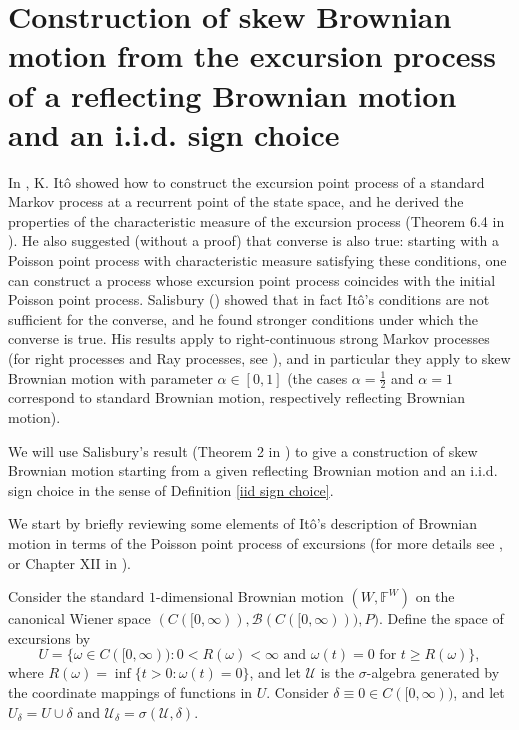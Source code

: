 \documentclass[reqno]{amsart}
\theoremstyle{definition}
\theoremstyle{remark}
\numberwithin{equation}{section}
\begin{document}
\appendix
\section{Construction of skew Brownian motion from the excursion process of a reflecting Brownian motion and an i.i.d. sign choice}\label{Appendix}

In \cite{Ito}, K. It\^{o} showed how to construct the excursion point process of a standard Markov process at a recurrent point of the state space, and he derived the properties of the characteristic measure of the excursion process (Theorem 6.4 in \cite{Ito}). He also suggested (without a proof) that converse is also true: starting with a Poisson point process with characteristic measure satisfying these conditions, one can construct a process whose excursion point process coincides with the initial Poisson point process. Salisbury (\cite{Salisbury1}) showed that in fact It\^{o}'s conditions are not sufficient for the converse, and he found stronger conditions under which the converse is true. His results apply to right-continuous strong Markov processes (for right processes and Ray processes, see \cite{Salisbury2}), and in particular they apply to skew Brownian motion with parameter $\alpha\in [0,1]$ (the cases $\alpha=\frac12$ and $\alpha=1$ correspond to standard Brownian motion, respectively reflecting Brownian motion).

We will use Salisbury's result (Theorem 2 in \cite{Salisbury1}) to give a construction of skew Brownian motion starting from a given reflecting Brownian motion and an i.i.d. sign choice in the sense of Definition \ref{iid sign choice}.

We start by briefly reviewing some elements of It\^{o}'s description of Brownian motion in terms of the Poisson point process of excursions (for more details see \cite{Ito}, or Chapter XII in \cite{Revuz and Yor}).

Consider the standard $1$-dimensional Brownian motion $(W,\mathbb{F}^W)$ on the canonical Wiener space $(C([0,\infty)),\mathcal{B}(C([0,\infty))),P)$. Define the space of excursions by $$U=\{\omega\in C([0,\infty)): 0<R(\omega)<\infty \text{ and } \omega(t)=0 \text{ for } t\ge R(\omega)\},$$
where $R(\omega)=\inf\{t>0: \omega(t)=0\}$, and let $\mathcal{U}$ is the $\sigma$-algebra generated by the coordinate mappings of functions in $U$. Consider $\delta\equiv 0 \in C([0,\infty))$, and let $U_\delta=U\cup\delta$ and $\mathcal{U}_\delta=\sigma (\mathcal{U},{\delta})$.
\end{document}
